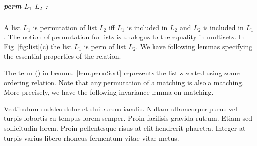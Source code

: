\documentclass[a4paper,UKenglish,cleveref, autoref]{lipics-v2019}
\begin{document}
\subparagraph*{perm $L_1$ $L_2$ :} A list $L_1$  is permutation of list $L_2$  iff $L_1$  is included in $L_2$ and $L_2$ is included in $L_1$.  The notion of permutation for lists is analogus to the equality in multisets. In Fig~\ref{fig:list}(c) the list $L_1$  is perm of list $L_2$. We have following lemmas specifying the essential properties of the  relation.

\begin{lemma}
\end{lemma}
\begin{lemma}
\end{lemma}
\begin{lemma}\label{lem:permSort}
\end{lemma}

The term (\emph{}) in Lemma~\ref{lem:permSort} represents the list $s$ sorted using some ordering relation.  Note that any permutation of a matching is also a matching.  More precisely,  we have the following invariance lemma on matching.
\begin{lemma}
\end{lemma}
\begin{lemma}
\tw{ \textcolor{gray}{ } }
\end{lemma}







\newpage

 

\begin{lemma}
\label{lemma:lorem}
Vestibulum sodales dolor et dui cursus iaculis. Nullam ullamcorper purus vel turpis lobortis eu tempus lorem semper. Proin facilisis gravida rutrum. Etiam sed sollicitudin lorem. Proin pellentesque risus at elit hendrerit pharetra. Integer at turpis varius libero rhoncus fermentum vitae vitae metus.
\end{lemma}
\end{document}

